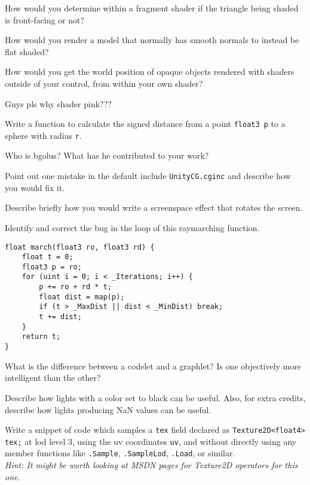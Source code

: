 \documentclass{exam}
\begin{document}
\begin{questions}
\question How would you determine within a fragment shader if the triangle being shaded is front-facing or not?
\vspace{100pt}

\question How would you render a model that normally has smooth normals to instead be flat shaded?
\vspace{100pt}

\question How would you get the world position of opaque objects rendered with shaders outside of your control, from within your own shader?
\vspace{100pt}

\question Guys pls why shader pink???
\vspace{100pt}

\question Write a function to calculate the signed distance from a point \texttt{float3 p} to a sphere with radius \texttt{r}.
\vspace{100pt}

\question Who is bgolus? What has he contributed to your work?
\vspace{100pt}

\question Point out one mistake in the default include \texttt{UnityCG.cginc} and describe how you would fix it.
\vspace{100pt}

\question Describe briefly how you would write a screenspace effect that rotates the screen.
\vspace{100pt}

\question Identify and correct the bug in the loop of this raymarching function.
\begin{verbatim}
float march(float3 ro, float3 rd) {
    float t = 0;
    float3 p = ro;
    for (uint i = 0; i < _Iterations; i++) {
        p += ro + rd * t;
        float dist = map(p);
        if (t > _MaxDist || dist < _MinDist) break;
        t += dist;
    }
    return t;
}
\end{verbatim}
\vspace{100pt}

\question What is the difference between a codelet and a graphlet? Is one objectively more intelligent than the other?
\vspace{100pt}

\question Describe how lights with a color set to black can be useful. Also, for extra credits, describe how lights producing NaN values can be useful.
\vspace{100pt}

\question Write a snippet of code which samples a \texttt{tex} field declared as \texttt{Texture2D<float4> tex;} at lod level 3, using the uv coordinates \texttt{uv}, and without directly using any member functions like \texttt{.Sample}, \texttt{.SampleLod}, \texttt{.Load}, or similar.\\ \textit{Hint: It might be worth looking at MSDN pages for Texture2D operators for this one.}
\vspace{100pt}

\end{questions}
\end{document}
